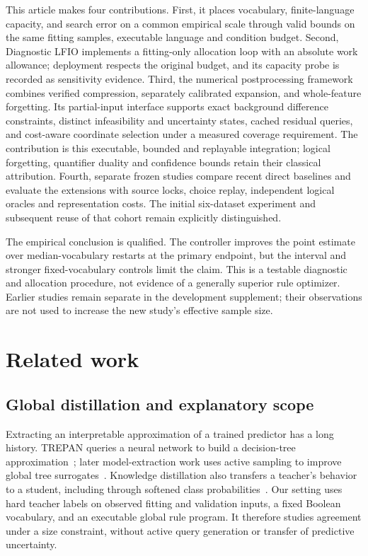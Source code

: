 \documentclass[review,12pt]{elsarticle}
\begin{document}
This article makes four contributions. First, it places vocabulary, finite-language capacity, and search error on a common empirical scale through valid bounds on the same fitting samples, executable language and condition budget. Second, Diagnostic LFIO implements a fitting-only allocation loop with an absolute work allowance; deployment respects the original budget, and its capacity probe is recorded as sensitivity evidence. Third, the numerical postprocessing framework combines verified compression, separately calibrated expansion, and whole-feature forgetting. Its partial-input interface supports exact background difference constraints, distinct infeasibility and uncertainty states, cached residual queries, and cost-aware coordinate selection under a measured coverage requirement. The contribution is this executable, bounded and replayable integration; logical forgetting, quantifier duality and confidence bounds retain their classical attribution. Fourth, separate frozen studies compare recent direct baselines and evaluate the extensions with source locks, choice replay, independent logical oracles and representation costs. The initial six-dataset experiment and subsequent reuse of that cohort remain explicitly distinguished.

The empirical conclusion is qualified. The controller improves the point estimate over median-vocabulary restarts at the primary endpoint, but the interval and stronger fixed-vocabulary controls limit the claim. This is a testable diagnostic and allocation procedure, not evidence of a generally superior rule optimizer. Earlier studies remain separate in the development supplement; their observations are not used to increase the new study's effective sample size.

\section{Related work}
\subsection{Global distillation and explanatory scope}
Extracting an interpretable approximation of a trained predictor has a long history. TREPAN queries a neural network to build a decision-tree approximation~\citep{craven1995}; later model-extraction work uses active sampling to improve global tree surrogates~\citep{bastani2019}. Knowledge distillation also transfers a teacher's behavior to a student, including through softened class probabilities~\citep{hinton2015}. Our setting uses hard teacher labels on observed fitting and validation inputs, a fixed Boolean vocabulary, and an executable global rule program. It therefore studies agreement under a size constraint, without active query generation or transfer of predictive uncertainty.
\end{document}
